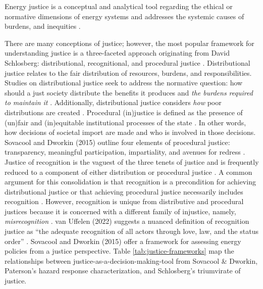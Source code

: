 

Energy justice is a conceptual and analytical tool regarding the ethical or
normative dimensions of energy systems and addresses the systemic causes of
burdens, and inequities \cite{sovacool_energy_2015}.

    
    There are many conceptions of justice; however, the most popular framework
    for understanding justice is a three-faceted approach originating from David
    Schlosberg: distributional, recognitional, and procedural justice
    \cite{schlosberg_2_2007}.
    Distributional justice relates to the fair distribution of resources,
    burdens, and responsibilities. Studies on distributional justice seek to
    address the normative question: how should a just society distribute the
    benefits it produces and \textit{the burdens required to maintain it}
    \cite{brighouse_justice_2004}. Additionally, distributional justice
    considers \textit{how} poor distributions are created
    \cite{schlosberg_2_2007}.
    Procedural (in)justice is defined as the presence of (un)fair and
    (in)equitable institutional processes of the state \cite{schlosberg_2_2007}.
    In other words, how decisions of societal import are made and who is
    involved in those decisions. Sovacool and Dworkin (2015) outline four
    elements of procedural justice: transparency, meaningful participation,
    impartiality, and avenues for redress \cite{sovacool_energy_2015}.    
Justice of recognition is the vaguest of the three tenets of justice and is
    frequently reduced to a component of either distribution or procedural
    justice \cite{schlosberg_2_2007, van_uffelen_revisiting_2022}. A common
    argument for this consolidation is that recognition is a precondition for
    achieving distributional justice or that achieving procedural justice
    necessarily includes recognition \cite{schlosberg_2_2007}. However,
    recognition is unique from distributive and procedural justices because it
    is concerned with a different family of injustice, namely,
    \textit{misrecognition} \cite{van_uffelen_revisiting_2022}. van Uffelen
    (2022) suggests a nuanced definition of recognition justice as ``the
    adequate recognition of all actors through love, law, and the status order''
    \cite{van_uffelen_revisiting_2022}.
Sovacool and Dworkin (2015) offer a framework for assessing energy policies from
a justice perspective. Table \ref{tab:justice-frameworks} map the relationships
between justice-as-a-decision-making-tool from Sovacool \& Dworkin, Paterson's
hazard response characterization, and Schlosberg's triumvirate of justice. 

